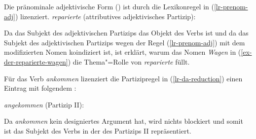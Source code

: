 {Die pränominale adjektivische Form () ist durch die Lexikonregel in (\ref{lr-prenom-adj})
lizenziert.
\eas
{\em reparierte} (attributives adjektivisches Partizip):\\
\zs

\noindent
Da das Subjekt des adjektivischen Partizips das Objekt des Verbs ist und
da das Subjekt des adjektivischen Partizips wegen der Regel (\ref{lr-prenom-adj})
mit dem modifizierten Nomen koindiziert ist, ist erklärt, warum das Nomen \emph{Wagen} 
in (\ref{ex-der-reparierte-wagen}) die Thema"=Rolle von \emph{reparierte} füllt.

Für das Verb \emph{ankommen} lizenziert die Partizipregel in (\ref{lr-da-reduction}) einen Eintrag
mit folgendem \localw:

\eas
\emph{angekommen} (Partizip II):\\
\zs

\noindent
Da \emph{ankommen} kein designiertes Argument hat, wird nichts blockiert und somit ist das Subjekt des
Verbs in der \compsl des Partizips II repräsentiert.

}
